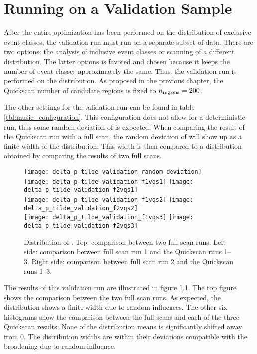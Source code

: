
\chapter{Running on a Validation Sample}
After the entire optimization has been performed on the \sumpT distribution of exclusive event classes, the validation run must run on a separate subset of data. There are two options: the analysis of inclusive event classes or scanning of a different distribution. The latter options is favored and chosen because it keeps the number of event classes approximately the same. Thus, the validation run is performed on the \Minv distribution. As proposed in the previous chapter, the Quickscan number of candidate regions is fixed to ${n_\mathrm{regions}} = \num{200}$. 

The other settings for the validation run can be found in table \ref{tbl:music_configuration}. This configuration does not allow for a deterministic run, thus some random deviation of \ptilde is expected. When comparing the result of the Quickscan run with a full scan, the random deviation of \ptilde will show up as a finite width of the \sigmarel distribution. This width is then compared to a \sigmarel distribution obtained by comparing the results of two full scans.

\begin{figure}[htbp]
	\centering
	\texttt{[image: delta\_p\_tilde\_validation\_random\_deviation]} \\
	\texttt{[image: delta\_p\_tilde\_validation\_f1vqs1]}		\texttt{[image: delta\_p\_tilde\_validation\_f2vqs1]} \\
	\texttt{[image: delta\_p\_tilde\_validation\_f1vqs2]}
	\texttt{[image: delta\_p\_tilde\_validation\_f2vqs2]} \\
	\texttt{[image: delta\_p\_tilde\_validation\_f1vqs3]}
	\texttt{[image: delta\_p\_tilde\_validation\_f2vqs3]} \\
	\caption{Distribution of \sigmarel. Top: comparison between two full scan runs. Left side: comparison between full scan run \num{1} and the Quickscan runs \numrange{1}{3}. Right side: comparison between full scan run \num{2} and the Quickscan runs \numrange{1}{3}.}
	\label{fig:validation_result}
\end{figure}

The results of this validation run are illustrated in figure \ref{fig:validation_result}. The top figure shows the comparison between the two full scan runs. As expected, the  \sigmarel distribution shows a finite width due to random influences. The other six histograms show the comparison between the full scans and each of the three Quickscan results.
None of the distribution means is significantly shifted away from \num{0}. The distribution widths are within their deviations compatible with the broadening due to random influence.

